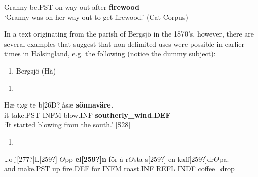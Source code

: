 Granny  be.PST  on  way  out  after  \textbf{firewood}\\ %


‘Granny was on her way out to get firewood.’ (Cat Corpus)
\z


In a text originating from the parish of Bergsjö in the 1870’s, however, there are several examples that suggest that non-delimited uses were possible in earlier times in Hälsingland, e.g. the following (notice the dummy subject):

\begin{enumerate} %
\item 
\label{bkm:Ref154221800}Bergsjö (Hä)

\end{enumerate} %
\setcounter{listLFOxcviiileveli}{0}
\begin{enumerate} %
\item 
\end{enumerate} %
\ea\label{}
\gll Hæ  t$\omega $g  te  b[26D?]åsæ  \textbf{sönnaväre.}\\


it  take.PST  INFM  blow.INF  \textbf{southerly\_wind.DEF}\\ %


‘It started blowing from the south.’ [S28]
\z

\begin{enumerate} %
\item 
\end{enumerate} %
\ea\label{}
\gll …o  j[277?]L[259?]  $\Theta $pp  \textbf{el[259?]n} för  å  r$\Theta $sta  s[259?]  en  kaff[259?]dr$\Theta $pa.\\


and  make.PST  up  fire.DEF  for  INFM  roast.INF  REFL  INDF  coffee\_drop\\ %


